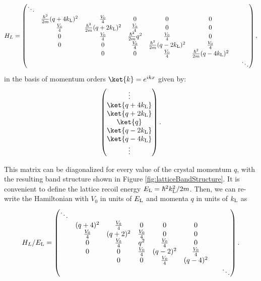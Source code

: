 \begin{equation}
H_L =
 \begin{pmatrix} \ddots &  & & & & & & \\ 
 & \frac{\hbar^2}{2m}(q + 4 k_{\rm L} )^2 & \frac{V_0}{4} & 0 & 0 & 0 &  \\
 & \frac{V_0}{4} &\frac{\hbar^2}{2m}(q + 2 k_{\rm L} )^2 & \frac{V_0}{4} & 0 & 0 &  \\
& 0 & \frac{V_0}{4} & \frac{\hbar^2}{2m}q^2 & \frac{V_0}{4} & 0 &  \\
 & 0 & 0 & \frac{V_0}{4} & \frac{\hbar^2}{2m}(q - 2 k_{\rm L})^2 &\frac{V_0}{4} &  \\
 &  & 0 & 0 & \frac{V_0}{4} & \frac{\hbar^2}{2m}(q - 4 k_{\rm L})^2 &  \\
& & & & & & &  \ddots \end{pmatrix} \\,
\label{eqn:LatHam}
\end{equation}
in the basis of momentum orders $\ket{k}=e^{i k x}$ given by:
\begin{equation}
 \begin{pmatrix} \vdots \\
\ket{q+4 k_{\rm L}}\\
\ket{q+2 k_{\rm L}}\\
\ket{q}\\
\ket{q -2 k_{\rm L}}\\
\ket{q - 4 k_{\rm L}}\\
\vdots
\end{pmatrix} \\.
\end{equation}

This matrix can be diagonalized for every value of the crystal momentum $q$, with the resulting band structure shown in Figure \ref{fig:latticeBandStructure}. It is convenient to define the lattice recoil energy $E_{\rm L} = \hbar^2 k_{\rm L}^2/2m$. Then, we can re-write the Hamiltonian with $V_0$ in units of $E_{\rm L}$ and momenta $q$ in units of $k_{\rm L}$ as 
\begin{equation}
H_L/E_{\rm L} =
 \begin{pmatrix} \ddots &  & & & & & & \\ 
 & (q + 4)^2 & \frac{V_0}{4} & 0 & 0 & 0 &  \\
 & \frac{V_0}{4} &(q + 2)^2 & \frac{V_0}{4} & 0 & 0 &  \\
& 0 & \frac{V_0}{4} & q^2 & \frac{V_0}{4} & 0 &  \\
 & 0 & 0 & \frac{V_0}{4} & (q - 2)^2 &\frac{V_0}{4} &  \\
 &  & 0 & 0 & \frac{V_0}{4} & (q  - 4)^2 &  \\
& & & & & & &  \ddots \end{pmatrix} \\.
\end{equation}

